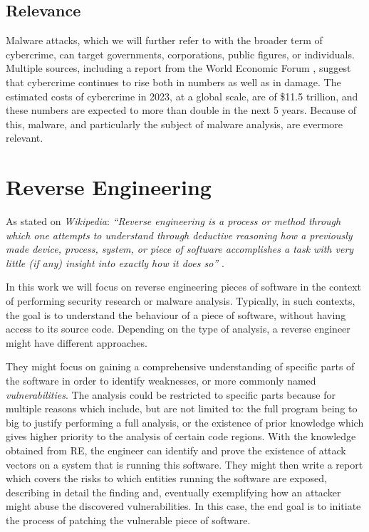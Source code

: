 \subsection{Relevance}

Malware attacks, which we will further refer to with the broader term of cybercrime, can target governments, corporations, public figures, or individuals. Multiple sources, including a report from the World Economic Forum \cite{wef_cybercrime}, suggest that cybercrime continues to rise both in numbers as well as in damage. The estimated costs of cybercrime in 2023, at a global scale, are of \$11.5 trillion, and these numbers are expected to more than double in the next 5 years. Because of this, malware, and particularly the subject of malware analysis, are evermore relevant.

\section{Reverse Engineering} %
\label{sec:reverse_engineering}


As stated on \emph{Wikipedia}: \emph{``Reverse engineering is a process or method through which one attempts to understand through deductive reasoning how a previously made device, process, system, or piece of software accomplishes a task with very little (if any) insight into exactly how it does so''} \cite{re_wiki}.

In this work we will focus on reverse engineering pieces of software in the context of performing security research or malware analysis. Typically, in such contexts, the goal is to understand the behaviour of a piece of software, without having access to its source code. Depending on the type of analysis, a reverse engineer might have different approaches. 

They might focus on gaining a comprehensive understanding of specific parts of the software in order to identify weaknesses, or more commonly named \emph{vulnerabilities}. The analysis could be restricted to specific parts because for multiple reasons which include, but are not limited to: the full program being to big to justify performing a full analysis, or the existence of prior knowledge which gives higher priority to the analysis of certain code regions. With the knowledge obtained from RE, the engineer can identify and prove the existence of attack vectors on a system that is running this software. They might then write a report which covers the risks to which entities running the software are exposed, describing in detail the finding and, eventually exemplifying how an attacker might abuse the discovered vulnerabilities. In this case, the end goal is to initiate the process of patching the vulnerable piece of software. %

